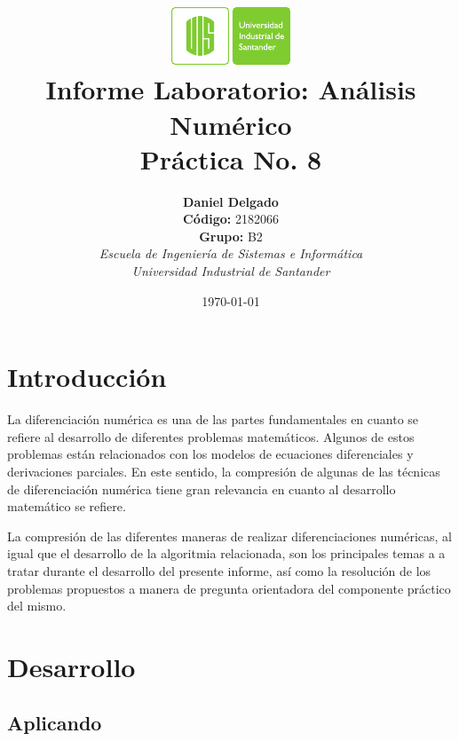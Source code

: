 \documentclass[english,notitlepage,letterpaper, 10pt]{article} %
\newcommand{\university}{\normalsize Universidad Industrial de Santander}
\newcommand{\faculty}{\normalsize  Escuela de Ingenier\'ia de Sistemas e Inform\'atica}
\newcommand{\codigo}{\normalsize  2182066}
\newcommand{\grupo}{\normalsize  B2}
\begin{document}
\title{	\vspace{-12mm}\includegraphics[width=0.2\linewidth]{Logos/UIS.pdf}\\Informe Laboratorio: An\'alisis Num\'erico\\  \centering Pr\'actica No. 8}
\author{
  \textbf{Daniel Delgado} \\ \textbf{C\'odigo:} \codigo\\
  \textbf{Grupo:} \grupo\\
  \textit{\faculty}\\
  \textit{\university}}
\date{\today}
\maketitle

\section{Introducción}

La diferenciación numérica es una de las partes fundamentales en cuanto se refiere al desarrollo de diferentes problemas matemáticos. Algunos de estos problemas están relacionados con los modelos de ecuaciones diferenciales y derivaciones parciales. En este sentido, la compresión de algunas de las técnicas de diferenciación numérica tiene gran relevancia en cuanto al desarrollo matemático se refiere.

La compresión de las diferentes maneras de realizar diferenciaciones numéricas, al igual que el desarrollo de la algoritmia relacionada, son los principales temas a a tratar durante el desarrollo del presente informe, así como la resolución de los problemas propuestos a manera de pregunta orientadora del componente práctico del mismo.

\section{Desarrollo}

\subsection{Aplicando}
\end{document}
